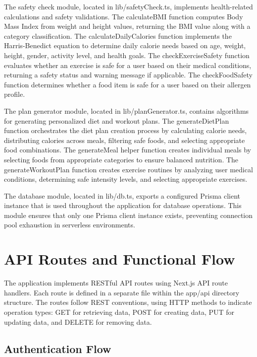 The safety check module, located in lib/safetyCheck.ts, implements health-related calculations and safety validations. The calculateBMI function computes Body Mass Index from weight and height values, returning the BMI value along with a category classification. The calculateDailyCalories function implements the Harris-Benedict equation to determine daily calorie needs based on age, weight, height, gender, activity level, and health goals. The checkExerciseSafety function evaluates whether an exercise is safe for a user based on their medical conditions, returning a safety status and warning message if applicable. The checkFoodSafety function determines whether a food item is safe for a user based on their allergen profile.

The plan generator module, located in lib/planGenerator.ts, contains algorithms for generating personalized diet and workout plans. The generateDietPlan function orchestrates the diet plan creation process by calculating calorie needs, distributing calories across meals, filtering safe foods, and selecting appropriate food combinations. The generateMeal helper function creates individual meals by selecting foods from appropriate categories to ensure balanced nutrition. The generateWorkoutPlan function creates exercise routines by analyzing user medical conditions, determining safe intensity levels, and selecting appropriate exercises.

The database module, located in lib/db.ts, exports a configured Prisma client instance that is used throughout the application for database operations. This module ensures that only one Prisma client instance exists, preventing connection pool exhaustion in serverless environments.

\section{API Routes and Functional Flow}

The application implements RESTful API routes using Next.js API route handlers. Each route is defined in a separate file within the app/api directory structure. The routes follow REST conventions, using HTTP methods to indicate operation types: GET for retrieving data, POST for creating data, PUT for updating data, and DELETE for removing data.

\subsection{Authentication Flow}

